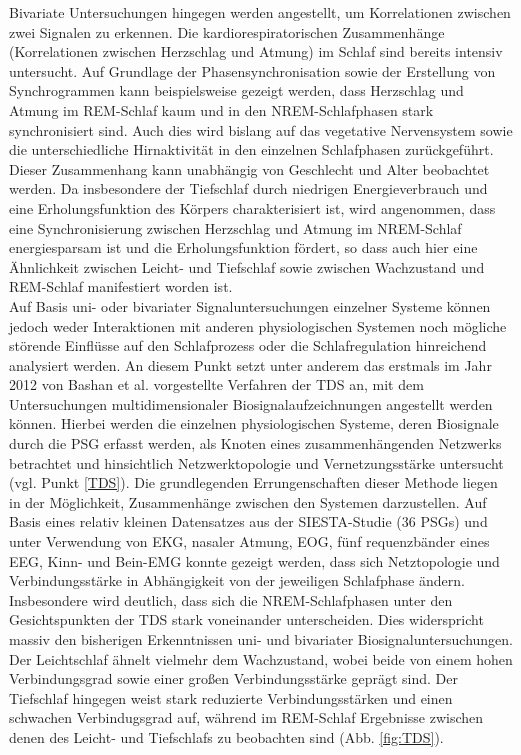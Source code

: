 Bivariate Untersuchungen hingegen werden angestellt, um Korrelationen zwischen zwei Signalen zu erkennen. Die kardiorespiratorischen Zusammenhänge (Korrelationen zwischen Herzschlag und Atmung) im Schlaf sind bereits intensiv untersucht. Auf Grundlage der Phasensynchronisation sowie der Erstellung von Synchrogrammen kann beispielsweise gezeigt werden, dass Herzschlag und Atmung im \acs{REM}-Schlaf kaum und in den \acs{NREM}-Schlafphasen stark synchronisiert sind. Auch dies wird bislang auf das vegetative Nervensystem sowie die unterschiedliche Hirnaktivität in den einzelnen Schlafphasen zurückgeführt. Dieser Zusammenhang kann unabhängig von Geschlecht und Alter beobachtet werden. Da insbesondere der Tiefschlaf durch niedrigen Energieverbrauch und eine Erholungsfunktion des Körpers charakterisiert ist, wird angenommen, dass eine Synchronisierung zwischen Herzschlag und Atmung im \acs{NREM}-Schlaf energiesparsam ist und die Erholungsfunktion fördert, so dass auch hier eine Ähnlichkeit zwischen Leicht- und Tiefschlaf sowie zwischen Wachzustand und \acs{REM}-Schlaf manifestiert worden ist. \parencite{penzel_cardiovascular_2007, hamann_automated_2009, bartsch_experimental_2007}\\

Auf Basis uni- oder bivariater Signaluntersuchungen einzelner Systeme können jedoch weder Interaktionen mit anderen physiologischen Systemen noch mögliche störende Einflüsse auf den Schlafprozess oder die Schlafregulation hinreichend analysiert werden. An diesem Punkt setzt unter anderem das erstmals im Jahr 2012 von Bashan et al. vorgestellte Verfahren der \acs{TDS} an, mit dem Untersuchungen multidimensionaler Biosignalaufzeichnungen angestellt werden können. Hierbei werden die einzelnen physiologischen Systeme, deren Biosignale durch die \acs{PSG} erfasst werden, als Knoten eines zusammenhängenden Netzwerks betrachtet und hinsichtlich Netzwerktopologie und Vernetzungsstärke untersucht (vgl. Punkt \ref{TDS}). Die grundlegenden Errungenschaften dieser Methode liegen in der Möglichkeit, Zusammenhänge zwischen den Systemen darzustellen. Auf Basis eines relativ kleinen Datensatzes aus der SIESTA-Studie (36 \acs{PSG}s) \parencite{klosch_siesta_2001} und unter Verwendung von \acs{EKG}, nasaler Atmung, \acs{EOG}, fünf requenzbänder eines \acs{EEG}, Kinn- und Bein-\acs{EMG} konnte gezeigt werden, dass sich Netztopologie und Verbindungsstärke in Abhängigkeit von der jeweiligen Schlafphase ändern. Insbesondere wird deutlich, dass sich die \acs{NREM}-Schlafphasen unter den Gesichtspunkten der \acs{TDS} stark voneinander unterscheiden. Dies widerspricht massiv den bisherigen Erkenntnissen uni- und bivariater Biosignaluntersuchungen. Der Leichtschlaf ähnelt vielmehr dem Wachzustand, wobei beide von einem hohen Verbindungsgrad sowie einer großen Verbindungsstärke geprägt sind. Der Tiefschlaf hingegen weist stark reduzierte Verbindungsstärken und einen schwachen Verbindugsgrad auf, während im \acs{REM}-Schlaf Ergebnisse zwischen denen des Leicht- und Tiefschlafs zu beobachten sind (Abb. \ref{fig:TDS}). \parencite{bashan_network_2012}

